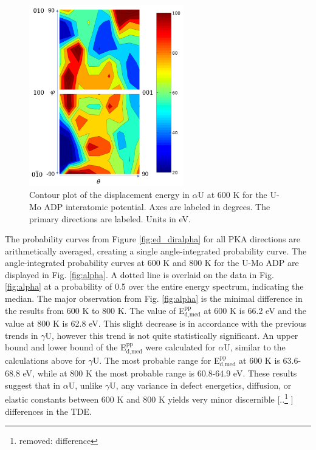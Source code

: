 \documentclass[review]{elsarticle}
\providecommand{\DIFaddtex}[1]{{\protect\color{blue} \sf #1}} %
\providecommand{\DIFdeltex}[1]{{\protect\color{red} [..\footnote{removed: #1} ]}} %
\providecommand{\DIFaddbegin}{} %
\providecommand{\DIFaddend}{} %
\providecommand{\DIFdelbegin}{} %
\providecommand{\DIFdelend}{} %
\providecommand{\DIFadd}[1]{\texorpdfstring{\DIFaddtex{#1}}{#1}} %
\providecommand{\DIFdel}[1]{\texorpdfstring{\DIFdeltex{#1}}{}} %
\newcommand{\DIFscaledelfig}{0.5}
\newlength{\DIFdelgraphicswidth} %
\newlength{\DIFdelgraphicsheight} %
\newcommand{\DIFaddincludegraphics}[2][]{{\color{blue}\fbox{\DIFOincludegraphics[#1]{#2}}}} %
\newcommand{\DIFdelincludegraphics}[2][]{%
\sbox{\DIFdelgraphicsbox}{\DIFOincludegraphics[#1]{#2}}%
\settoboxwidth{\DIFdelgraphicswidth}{\DIFdelgraphicsbox} %
\settoboxtotalheight{\DIFdelgraphicsheight}{\DIFdelgraphicsbox} %
\scalebox{\DIFscaledelfig}{%
\parbox[b]{\DIFdelgraphicswidth}{\usebox{\DIFdelgraphicsbox}\\[-\baselineskip] \rule{\DIFdelgraphicswidth}{0em}}\llap{\resizebox{\DIFdelgraphicswidth}{\DIFdelgraphicsheight}{%
\setlength{\unitlength}{\DIFdelgraphicswidth}%
\begin{picture}(1,1)%
\thicklines\linethickness{2pt} %
{\color[rgb]{1,0,0}\put(0,0){\framebox(1,1){}}}%
{\color[rgb]{1,0,0}\put(0,0){\line( 1,1){1}}}%
{\color[rgb]{1,0,0}\put(0,1){\line(1,-1){1}}}%
\end{picture}%
}\hspace*{3pt}}} %
} %
\DeclareRobustCommand{\DIFaddbegin}{\DIFOaddbegin \let\includegraphics\DIFaddincludegraphics} %
\DeclareRobustCommand{\DIFaddend}{\DIFOaddend \let\includegraphics\DIFOincludegraphics} %
\DeclareRobustCommand{\DIFdelbegin}{\DIFOdelbegin \let\includegraphics\DIFdelincludegraphics} %
\DeclareRobustCommand{\DIFdelend}{\DIFOaddend \let\includegraphics\DIFOincludegraphics} %
\begin{document}
\begin{figure}[h]
 \centering
 \includegraphics[width=0.6\textwidth]{600K_contourA.png} 
 \caption{Contour plot of the displacement energy in $\alpha$U at 600 K for the U-Mo ADP interatomic potential. Axes are labeled in degrees. The primary directions are labeled. Units in eV.}
 \label{fig:600Kcontour}
\end{figure}

\FloatBarrier

The probability curves from Figure \ref{fig:ed_diralpha} for all PKA directions are arithmetically averaged, creating a single angle-integrated probability curve. The angle-integrated probability curves at 600 K and 800 K for the U-Mo ADP are displayed in Fig. \ref{fig:alpha}. A dotted line is overlaid on the data in Fig. \ref{fig:alpha} at a probability of 0.5 over the entire energy spectrum, indicating the median. The major observation from Fig. \ref{fig:alpha} is the minimal difference in the results from 600 K to 800 K. The value of E$^{\textrm{pp}}_{\textrm{d,med}}$ at 600 K is 66.2 eV and the value at 800 K is 62.8 eV. This slight decrease is in accordance with the previous trends in $\gamma$U, however this trend is not quite statistically significant. An upper bound and lower bound of the E$^{\textrm{pp}}_{\textrm{d,med}}$ were calculated for $\alpha$U, similar to the calculations above for $\gamma$U. The most probable range for E$^{\textrm{pp}}_{\textrm{d,med}}$ at 600 K is 63.6-68.8 eV, while at 800 K the most probable range is 60.8-64.9 eV. These results suggest that in $\alpha$U, unlike $\gamma$U, any variance in defect energetics, diffusion, or elastic constants between 600 K and 800 K yields very minor discernible \DIFdelbegin \DIFdel{difference }\DIFdelend \DIFaddbegin \DIFadd{differences }\DIFaddend in the TDE.
\end{document}
